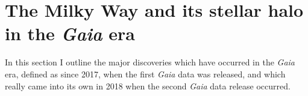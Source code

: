 
\section{The Milky Way and its stellar halo in the \textit{Gaia} era}

In this section I outline the major discoveries which have occurred in the \textit{Gaia} era, defined as since 2017, when the first \textit{Gaia} data was released, and which really came into its own in 2018 when the second \textit{Gaia} data release occurred.